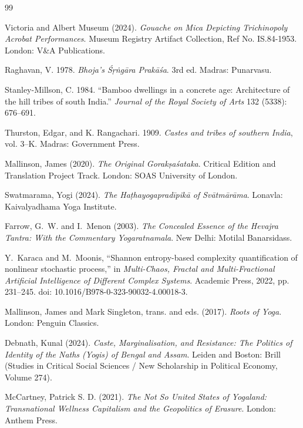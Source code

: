 \documentclass[11pt,twoside,letterpaper]{article}
\begin{document}
\begin{thebibliography}{99}


Victoria and Albert Museum (2024). \textit{Gouache on Mica Depicting Trichinopoly Acrobat Performances}. Museum Registry Artifact Collection, Ref No. IS.84-1953. London: V\&A Publications.

Raghavan, V. 1978. \textit{Bhoja's Śṛ\.{n}gāra Prakāśa}. 3rd ed. Madras: Punarvasu.

Stanley-Millson, C. 1984. ``Bamboo dwellings in a concrete age: Architecture of the hill tribes of south India.'' \textit{Journal of the Royal Society of Arts} 132 (5338): 676--691.

Thurston, Edgar, and K. Rangachari. 1909. \textit{Castes and tribes of southern India}, vol. 3--K. Madras: Government Press.

Mallinson, James (2020). \textit{The Original Gorakṣaśataka}. Critical Edition and Translation Project Track. London: SOAS University of London.

Swatmarama, Yogi (2024). \textit{The Haṭhayogapradīpikā of Svātmārāma}. Lonavla: Kaivalyadhama Yoga Institute.

Farrow, G.~W. and I.~Menon (2003). \textit{The Concealed Essence of the Hevajra Tantra: With the Commentary Yogaratnamala}. New Delhi: Motilal Banarsidass.

Y.~Karaca and M.~Moonis, ``Shannon entropy-based complexity quantification of nonlinear stochastic process,'' in \textit{Multi-Chaos, Fractal and Multi-Fractional Artificial Intelligence of Different Complex Systems}. Academic Press, 2022, pp. 231--245. doi: 10.1016/B978-0-323-90032-4.00018-3.

Mallinson, James and Mark Singleton, trans. and eds. (2017). \textit{Roots of Yoga}. London: Penguin Classics.

Debnath, Kunal (2024). \textit{Caste, Marginalisation, and Resistance: The Politics of Identity of the Naths (Yogis) of Bengal and Assam}. Leiden and Boston: Brill (Studies in Critical Social Sciences / New Scholarship in Political Economy, Volume 274).

McCartney, Patrick S. D. (2021). \textit{The Not So United States of Yogaland: Transnational Wellness Capitalism and the Geopolitics of Erasure}. London: Anthem Press.


\end{thebibliography}
\end{document}
